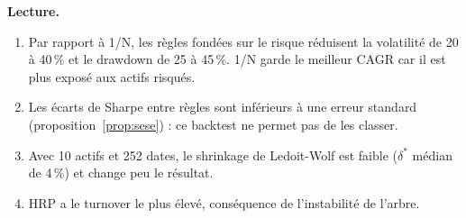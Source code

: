 \documentclass[11pt,a4paper]{article}
\theoremstyle{pdef}
\theoremstyle{pstate}
\newcommand{\pct}{\,\%}
\begin{document}
\textbf{Lecture.}
\begin{enumerate}
\item Par rapport à 1/N, les règles fondées sur le risque réduisent la volatilité de 20
à 40\pct{} et le drawdown de 25 à 45\pct. 1/N garde le meilleur CAGR car il est plus
exposé aux actifs risqués.
\item Les écarts de Sharpe entre règles sont inférieurs à une erreur standard
(proposition~\ref{prop:sese}) : ce backtest ne permet pas de les classer.
\item Avec 10 actifs et 252 dates, le shrinkage de Ledoit-Wolf est faible ($\delta^\ast$
médian de 4\pct) et change peu le résultat.
\item HRP a le turnover le plus élevé, conséquence de l'instabilité de l'arbre.
\end{enumerate}
\end{document}
